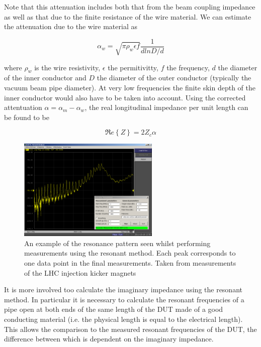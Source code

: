 \documentclass[12pt,a4paper,twopage,openright]{article}
\begin{document}
Note that this attenuation includes both that from the beam coupling impedance as well as that due to the finite resistance of the wire material. We can estimate the attenuation due to the wire material as

\begin{equation}
\alpha_{w} = \sqrt{\pi \rho_{w} \epsilon f} \frac{1}{d ln D/d}
\label{eqn:wire_atten}
\end{equation}

where $\rho_{w}$ is the wire resistivity, $\epsilon$ the permitivitty, $f$ the frequency, $d$ the diameter of the inner conductor and $D$ the diameter of the outer conductor (typically the vacuum beam pipe diameter). At very low frequencies the finite skin depth of the inner conductor would also have to be taken into account. Using the corrected attentuation $\alpha = \alpha_{m} - \alpha_{w}$, the real longitudinal impedance per unit length can be found to be 

\begin{equation}
\Re e\left\{ Z \right\} = 2Z_{c} \alpha
\label{eqn:res_imp}
\end{equation}

\begin{figure}
\begin{center}
\includegraphics[width=0.6\textwidth]{figures/coax-resonator.png}
\end{center}
\caption{An example of the resonance pattern seen whilst performing measurements using the resonant method. Each peak corresponds to one data point in the final measurements. Taken from measurements of the LHC injection kicker magnets}
\label{fig:res-resonancce-examples}
\end{figure}

It is more involved too calculate the imaginary impedance using the resonant method. In particular it is necessary to calculate the resonant frequencies of a pipe open at both ends of the same length of the DUT made of a good conducting material (i.e. the physical length is equal to the electrical length). This allows the comparison to the measured resonant frequencies of the DUT, the difference between which is dependent on the imaginary impedance.
\end{document}
